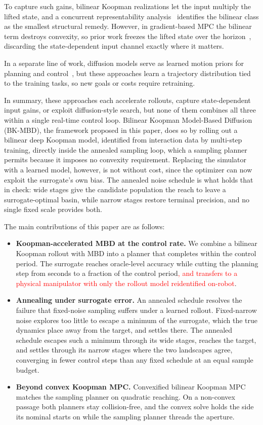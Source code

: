 \documentclass[letterpaper,10pt,conference]{ieeeconf}
\newcommand{\nd}[1]{\textcolor{red}{#1}}
\newcommand{\bkmbd}{\textsc{BK-MBD}}
\begin{document}
To capture such gains, bilinear Koopman realizations let the input multiply the lifted state, and a concurrent representability analysis~\cite{kim2026bilinear} identifies the bilinear class as the smallest structural remedy.
However, in gradient-based MPC the bilinear term destroys convexity, so prior work freezes the lifted state over the horizon~\cite{bruder2021bilinear}, discarding the state-dependent input channel exactly where it matters.

In a separate line of work, diffusion models serve as learned motion priors for planning and control~\cite{janner2022planning, chi2025diffusion, carvalho2023motion}, but these approaches learn a trajectory distribution tied to the training tasks, so new goals or costs require retraining.

In summary, these approaches each accelerate rollouts, capture state-dependent input gains, or exploit diffusion-style search, but none of them combines all three within a single real-time control loop.
Bilinear Koopman Model-Based Diffusion (\bkmbd{}), the framework proposed in this paper, does so by rolling out a bilinear deep Koopman model, identified from interaction data by multi-step training, directly inside the annealed sampling loop, which a sampling planner permits because it imposes no convexity requirement.
Replacing the simulator with a learned model, however, is not without cost, since the optimizer can now exploit the surrogate's own bias.
The annealed noise schedule is what holds that in check: wide stages give the candidate population the reach to leave a surrogate-optimal basin, while narrow stages restore terminal precision, and no single fixed scale provides both.

The main contributions of this paper are as follows:
\begin{itemize}
\item \textbf{Koopman-accelerated MBD at the control rate.}
We combine a bilinear Koopman rollout with MBD into a planner that completes within the control period. The surrogate reaches oracle-level accuracy while cutting the planning step from seconds to a fraction of the control period\nd{, and transfers to a physical manipulator with only the rollout model reidentified on-robot}.
\item \textbf{Annealing under surrogate error.}
An annealed schedule resolves the failure that fixed-noise sampling suffers under a learned rollout. Fixed-narrow noise explores too little to escape a minimum of the surrogate, which the true dynamics place away from the target, and settles there. The annealed schedule escapes such a minimum through its wide stages, reaches the target, and settles through its narrow stages where the two landscapes agree, converging in fewer control steps than any fixed schedule at an equal sample budget.
\item \textbf{Beyond convex Koopman MPC.}
Convexified bilinear Koopman MPC matches the sampling planner on quadratic reaching. On a non-convex passage both planners stay collision-free, and the convex solve holds the side its nominal starts on while the sampling planner threads the aperture.
\end{itemize}
\end{document}
